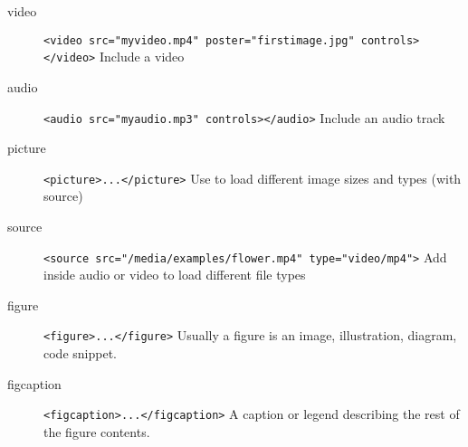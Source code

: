 \begin{description}
	\item[video] \texttt{<video src="myvideo.mp4" poster="firstimage.jpg" controls></video>} Include a video
	\item[audio] \texttt{<audio src="myaudio.mp3" controls></audio>} Include an audio track
	\item[picture] \texttt{<picture>...</picture>} Use to load different image sizes and types (with source)
	\item[source] \texttt{<source src="/media/examples/flower.mp4" type="video/mp4">} Add inside audio or video to load different file types
	\item[figure] \texttt{<figure>...</figure>} Usually a figure is an image, illustration, diagram, code snippet.
	\item[figcaption] \texttt{<figcaption>...</figcaption>} A caption or legend describing the rest of the figure contents.
\end{description}
